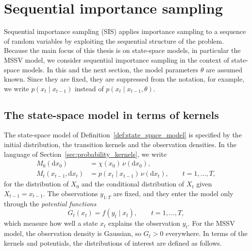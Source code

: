 \section{Sequential importance sampling}
\label{sec:sequential_importance_sampling}
Sequential importance sampling (SIS) applies importance sampling to a sequence of random variables by exploiting the sequential structure of the problem. Because the main focus of this thesis is on state-space models, in particular the MSSV model, we consider sequential importance sampling in the context of state-space models. In this and the next section, the model parameters $\theta$ are assumed known. Since they are fixed, they are suppressed from the notation, for example, we write $p(x_t\mid x_{t-1})$ instead of $p(x_t\mid x_{t-1},\theta)$.

\subsection{The state-space model in terms of kernels}
\label{sec:kernel_formulation}
The state-space model of Definition~\ref{def:state_space_model} is specified by the initial distribution, the transition kernels and the observation densities. In the language of Section~\ref{sec:probability_kernels}, we write
\begin{align}
    M_0(\mathrm{d}x_0) &= \chi(x_0)\,\nu(\mathrm{d}x_0), \\
    M_t(x_{t-1},\mathrm{d}x_t) &= p(x_t\mid x_{t-1})\,\nu(\mathrm{d}x_t), \qquad t=1,\ldots,T,
\end{align}
for the distribution of $X_0$ and the conditional distribution of $X_t$ given $X_{t-1}=x_{t-1}$. The observations $y_{1:T}$ are fixed, and they enter the model only through the \emph{potential functions}
\begin{equation}
    G_t(x_t) = f(y_t\mid x_t), \qquad t=1,\ldots,T,
\end{equation}
which measure how well a state $x_t$ explains the observation $y_t$. For the MSSV model, the observation density is Gaussian, so $G_t>0$ everywhere. In terms of the kernels and potentials, the distributions of interest are defined as follows.

